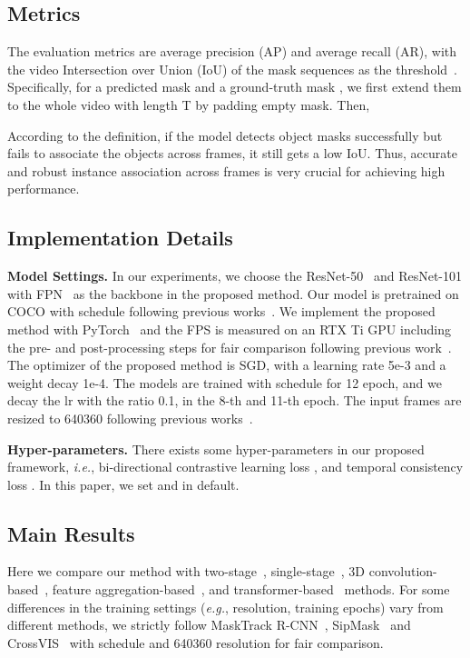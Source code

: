\documentclass[runningheads]{llncs}
\begin{document}
\subsection{Metrics}
The evaluation metrics are average precision (AP) and average recall (AR), with the video Intersection over Union (IoU) of the mask sequences as the threshold~\cite{yang2019video}. Specifically, for a predicted mask  and a ground-truth mask , we first extend them to the whole video with length T by padding empty mask. Then, 

According to the definition, if the model detects object masks successfully but fails to associate the objects across frames, it still gets a low IoU. Thus, accurate and robust instance association across frames is very crucial for achieving high performance.


\subsection{Implementation Details}\label{implement}
\noindent \textbf{Model Settings.} In our experiments, we choose the ResNet-50~\cite{he2016deep} and ResNet-101 with FPN~\cite{lin2017feature} as the backbone in the proposed method. Our model is pretrained on COCO  \cite{lin2014microsoft} with  schedule following previous works~\cite{cao2020sipmask,yang2021crossover,yang2019video}. We implement the proposed method with PyTorch~\cite{paszke2019pytorch} and the FPS is measured on an RTX  Ti GPU including the pre- and post-processing steps for fair comparison following previous work~\cite{yang2021crossover}. The optimizer of the proposed method is SGD, with a learning rate 5e-3 and a weight decay 1e-4. The models are trained with  schedule for 12 epoch, and we decay the lr with the ratio 0.1, in the 8-th and 11-th epoch. 
The input frames are resized to 640360 following previous works~\cite{yang2019video,yang2021crossover,fu2020compfeat}. 

\noindent \textbf{Hyper-parameters.} There exists some hyper-parameters in our proposed framework, \emph{i.e.}, bi-directional contrastive learning loss , and temporal consistency loss . In this paper, we set  and  in default.



\subsection{Main Results}\label{result}
Here we compare our method with two-stage~\cite{yang2018efficient,voigtlaender2019feelvos,yang2019video,bertasius2020classifying,fu2020compfeat}, single-stage~\cite{cao2020sipmask,wu2021track,liu2021sg}, 3D convolution-based~\cite{athar2020stem}, feature aggregation-based~\cite{li2021spatial}, and transformer-based~\cite{wang2021end} methods. For some differences in the training settings (\emph{e.g.}, resolution, training epochs) vary from different methods, we strictly follow MaskTrack R-CNN~\cite{yang2019video}, SipMask~\cite{cao2020sipmask} and CrossVIS~\cite{yang2021crossover} with  schedule and 640360 resolution for fair comparison.
\end{document}

